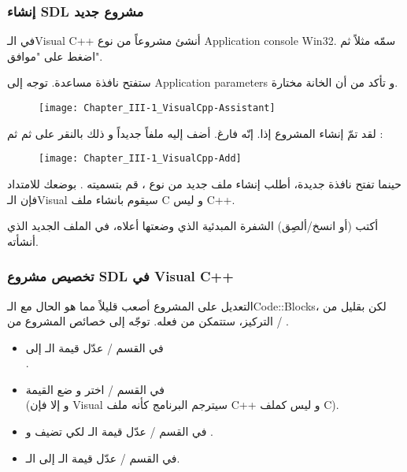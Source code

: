 \subsubsection{إنشاء \textenglish{SDL} مشروع جديد}

في الـ\textenglish{Visual C++}
أنشئ مشروعاً من نوع 
\textenglish{Application console Win32}.
سمّه مثلاً
ثم اضغط على "موافق".

ستفتح نافذة مساعدة. توجه إلى 
\textenglish{Application parameters}
و تأكد من أن الخانة
مختارة.

\begin{figure}[H]
	\centering
	\texttt{[image: Chapter\_III-1\_VisualCpp-Assistant]}
\end{figure}

لقد تمّ إنشاء المشروع إذا. إنّه فارغ. أضف إليه ملفاً جديداً و ذلك بالنقر على
ثم
ثم
 :

\begin{figure}[H]
	\centering
	\texttt{[image: Chapter\_III-1\_VisualCpp-Add]}
\end{figure}

حينما تفتح نافذة جديدة، أطلب إنشاء ملف جديد من نوع
،
قم بتسميته
.
بوضعك للامتداد
فإن الـ\textenglish{Visual}
سيقوم بانشاء ملف
\textenglish{C}
و ليس
\textenglish{C++}.

أكتب (أو انسخ/ألصِق) الشفرة المبدئية الذي وضعتها أعلاه، في الملف الجديد الذي أنشأته.

\subsubsection{تخصيص مشروع \textenglish{SDL} في \textenglish{Visual C++}}

التعديل على المشروع أصعب قليلاً مما هو الحال مع الـ\textenglish{Code::Blocks}،
لكن بقليل من التركيز، ستتمكن من فعله. توجّه إلى خصائص المشروع من
 / .

\begin{itemize}
	\item في القسم
	 / 
	عدّل قيمة الـ
	إلى\\
	.
	\item في القسم 
	 / 
	اختر
	و ضع القيمة\\
	(و إلا فإن
	\textenglish{Visual}
	سيترجم البرنامج كأنه ملف
	\textenglish{C++}
	و ليس كملف
	\textenglish{C}).
	\item في القسم  
	 / 
	عدّل قيمة الـ
	لكي تضيف
	و
	.
	\item في القسم
	 / 
	عدّل قيمة الـ
	إلى الـ.
\end{itemize}

